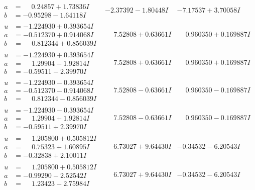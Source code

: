 \documentclass[1p]{elsarticle_modified}
\theoremstyle{definition}
\begin{document}
$$\begin{array}{c|c|c}
\begin{aligned}
a &= \phantom{-}0.24857 + 1.73836 I \\
b &= -0.95298 - 1.64118 I\end{aligned}
 & -2.37392 - 1.80448 I & -7.17537 + 3.70058 I \\ \hline\begin{aligned}
u &= -1.224930 + 0.393654 I \\
a &= -0.512370 + 0.914068 I \\
b &= \phantom{-}0.812344 + 0.856039 I\end{aligned}
 & \phantom{-}7.52808 + 0.63661 I & \phantom{-}0.960350 + 0.169887 I \\ \hline\begin{aligned}
u &= -1.224930 + 0.393654 I \\
a &= \phantom{-}1.29904 - 1.92814 I \\
b &= -0.59511 - 2.39970 I\end{aligned}
 & \phantom{-}7.52808 + 0.63661 I & \phantom{-}0.960350 + 0.169887 I \\ \hline\begin{aligned}
u &= -1.224930 - 0.393654 I \\
a &= -0.512370 - 0.914068 I \\
b &= \phantom{-}0.812344 - 0.856039 I\end{aligned}
 & \phantom{-}7.52808 - 0.63661 I & \phantom{-}0.960350 - 0.169887 I \\ \hline\begin{aligned}
u &= -1.224930 - 0.393654 I \\
a &= \phantom{-}1.29904 + 1.92814 I \\
b &= -0.59511 + 2.39970 I\end{aligned}
 & \phantom{-}7.52808 - 0.63661 I & \phantom{-}0.960350 - 0.169887 I \\ \hline\begin{aligned}
u &= \phantom{-}1.205800 + 0.505812 I \\
a &= \phantom{-}0.75323 + 1.60895 I \\
b &= -0.32838 + 2.10011 I\end{aligned}
 & \phantom{-}6.73027 + 9.64430 I & -0.34532 - 6.20543 I \\ \hline\begin{aligned}
u &= \phantom{-}1.205800 + 0.505812 I \\
a &= -0.99290 - 2.52542 I \\
b &= \phantom{-}1.23423 - 2.75984 I\end{aligned}
 & \phantom{-}6.73027 + 9.64430 I & -0.34532 - 6.20543 I \\ \hline\begin{aligned}

\end{aligned}
\end{array}$$
\end{document}
